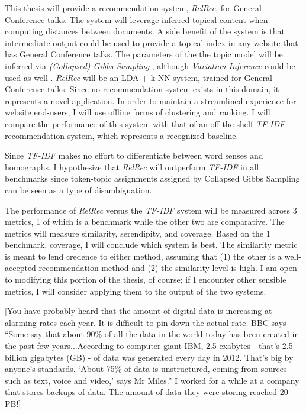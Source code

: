 This thesis will provide a recommendation system, \emph{RelRec}, for General Conference talks. The system will leverage inferred topical content when computing distances between documents. A side benefit of the system is that intermediate output could be used to provide a topical index in any website that has General Conference talks. The parameters of the the topic model will be inferred via \emph{(Collapsed) Gibbs Sampling} \citep{Porteous:2008:FCG:1401890.1401960}, although \emph{Variation Inference} could be used as well \citep{blei2006variational}. \emph{RelRec} will be an LDA + k-NN system, trained for General Conference talks. Since no recommendation system exists in this domain, it represents a novel application. In order to maintain a streamlined experience for website end-users, I will use offline forms of clustering and ranking. I will compare the performance of this system with that of an off-the-shelf \emph{TF-IDF} recommendation system, which represents a recognized baseline.

Since \emph{TF-IDF} makes no effort to differentiate between word senses and homographs, I hypothesize that \emph{RelRec} will outperform \emph{TF-IDF} in all benchmarks since token-topic assignments assigned by Collapsed Gibbs Sampling can be seen as a type of disambiguation.

The performance of \emph{RelRec} versus the \emph{TF-IDF} system will be measured across 3 metrics, 1 of which is a benchmark while the other two are comparative. The metrics will measure similarity, serendipity, and coverage. Based on the 1 benchmark, coverage, I will conclude which system is best. The similarity metric is meant to lend credence to either method, assuming that (1) the other is a well-accepted recommendation method and (2) the similarity level is high. I am open to modifying this portion of the thesis, of course; if I encounter other sensible metrics, I will consider applying them to the output of the two systems.




[You have probably heard that the amount of digital data is increasing at alarming rates each year. It is difficult to pin down the actual rate. BBC says ``Some say that about 90\% of all the data in the world today has been created in the past few years...According to computer giant IBM, 2.5 exabytes - that's 2.5 billion gigabytes (GB) - of data was generated every day in 2012. That's big by anyone's standards. ‘About 75\% of data is unstructured, coming from sources such as text, voice and video,’ says Mr Miles.'' I worked for a while at a company that stores backups of data. The amount of data they were storing reached 20 PB!]

